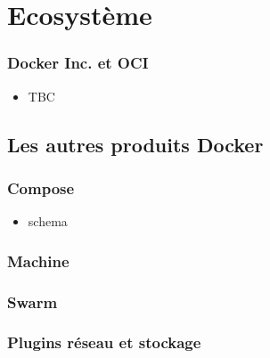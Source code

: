  \section[Docker]{Ecosystème}

\begin{frame}
    \frametitle{Docker Inc. et OCI}
    \begin{itemize}
      \item TBC \pause
    \end{itemize}
  \end{frame}


  \subsection[Docker]{Les autres produits Docker}

  \begin{frame}
    \frametitle{Compose}
    \begin{itemize}
      \item schema
    \end{itemize}
  \end{frame}

  \begin{frame}
    \frametitle{Machine}
  \end{frame}

  \begin{frame}
    \frametitle{Swarm}
  \end{frame}

  \begin{frame}
    \frametitle{Plugins réseau et stockage}
  \end{frame}
